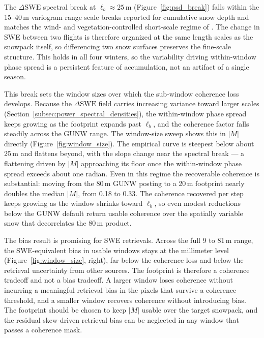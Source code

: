 \documentclass[tc, manuscript]{copernicus}
\begin{document}
The $\Delta\mathrm{SWE}$ spectral break at $\ell_b \approx 25$\,\unit{m} (Figure~\ref{fig:psd_break}) falls within the 15--40\,\unit{m} variogram range scale breaks reported for cumulative snow depth and matches the wind- and vegetation-controlled short-scale regime of \citet{trujillo2007topographic-0ec}. The change in SWE between two flights is therefore organized at the same length scales as the snowpack itself, so differencing two snow surfaces preserves the fine-scale structure. This holds in all four winters, so the variability driving within-window phase spread is a persistent feature of accumulation, not an artifact of a single season.

This break sets the window sizes over which the sub-window coherence loss develops. Because the $\Delta\mathrm{SWE}$ field carries increasing variance toward larger scales (Section~\ref{subsec:power_spectral_densities}), the within-window phase spread keeps growing as the footprint expands past $\ell_b$, and the coherence factor falls steadily across the GUNW range. The window-size sweep shows this in $|M|$ directly (Figure~\ref{fig:window_size}). The empirical curve is steepest below about 25\,\unit{m} and flattens beyond, with the slope change near the spectral break --- a flattening driven by $|M|$ approaching its floor once the within-window phase spread exceeds about one radian. Even in this regime the recoverable coherence is substantial: moving from the 80\,\unit{m} GUNW posting to a 20\,\unit{m} footprint nearly doubles the median $|M|$, from 0.18 to 0.33. The coherence recovered per step keeps growing as the window shrinks toward $\ell_b$, so even modest reductions below the GUNW default return usable coherence over the spatially variable snow that decorrelates the 80\,\unit{m} product.

The bias result is promising for SWE retrievals. Across the full 9 to 81\,\unit{m} range, the SWE-equivalent bias in usable windows stays at the millimeter level (Figure~\ref{fig:window_size}, right), far below the coherence loss and below the retrieval uncertainty from other sources. The footprint is therefore a coherence tradeoff and not a bias tradeoff. A larger window loses coherence without incurring a meaningful retrieval bias in the pixels that survive a coherence threshold, and a smaller window recovers coherence without introducing bias. The footprint should be chosen to keep $|M|$ usable over the target snowpack, and the residual skew-driven retrieval bias can be neglected in any window that passes a coherence mask.
\end{document}
